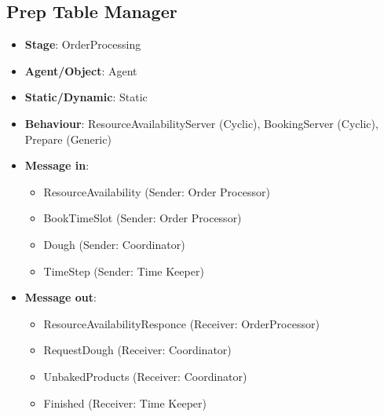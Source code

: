 \documentclass[12pt]{article}
\begin{document}
\subsection{Prep Table Manager}%
\label{sub:prep_manager}
\begin{itemize}
    \item \textbf{Stage}: OrderProcessing
    \item \textbf{Agent/Object}: Agent
    \item \textbf{Static/Dynamic}: Static
    \item \textbf{Behaviour}: ResourceAvailabilityServer (Cyclic), BookingServer (Cyclic), Prepare (Generic)
    \item \textbf{Message in}:
        \begin{itemize}
            \item ResourceAvailability (Sender: Order Processor)
            \item BookTimeSlot (Sender: Order Processor)
            \item Dough (Sender: Coordinator)
            \item TimeStep (Sender: Time Keeper)
        \end{itemize}
    \item \textbf{Message out}:
        \begin{itemize}
            \item ResourceAvailabilityResponce (Receiver: OrderProcessor)
            \item RequestDough (Receiver: Coordinator)
            \item UnbakedProducts (Receiver: Coordinator)
            \item Finished (Receiver: Time Keeper)
        \end{itemize}
\end{itemize}

\newpage{}
\end{document}
